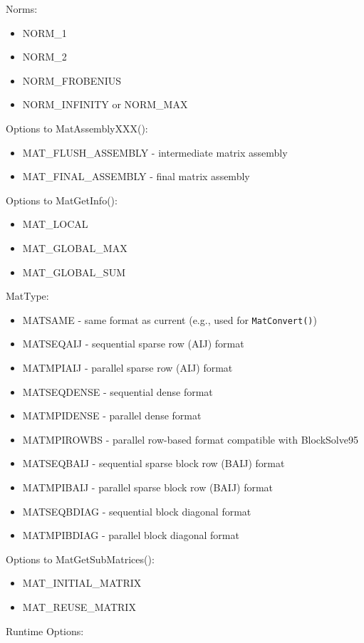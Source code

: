 Norms:
\begin{itemize}
\item NORM\_1
\item NORM\_2
\item NORM\_FROBENIUS
\item NORM\_INFINITY or NORM\_MAX  
\end{itemize}
Options to MatAssemblyXXX():
\begin{itemize}
\item MAT\_FLUSH\_ASSEMBLY - intermediate matrix assembly
\item MAT\_FINAL\_ASSEMBLY - final matrix assembly
\end{itemize}
Options to MatGetInfo():
\begin{itemize}
\item MAT\_LOCAL
\item MAT\_GLOBAL\_MAX
\item MAT\_GLOBAL\_SUM
\end{itemize}
MatType:
\begin{itemize}
\item MATSAME - same format as current (e.g., used for {\tt MatConvert()})
\item MATSEQAIJ - sequential sparse row (AIJ) format
\item MATMPIAIJ - parallel sparse row (AIJ) format
\item MATSEQDENSE - sequential dense format
\item MATMPIDENSE - parallel dense format
\item MATMPIROWBS - parallel row-based format compatible with BlockSolve95
\item MATSEQBAIJ - sequential sparse block row (BAIJ) format
\item MATMPIBAIJ - parallel sparse block row (BAIJ) format
\item MATSEQBDIAG - sequential block diagonal format
\item MATMPIBDIAG - parallel block diagonal format
\end{itemize}
Options to MatGetSubMatrices():
\begin{itemize}
\item MAT\_INITIAL\_MATRIX
\item MAT\_REUSE\_MATRIX
\end{itemize}
Runtime Options:
